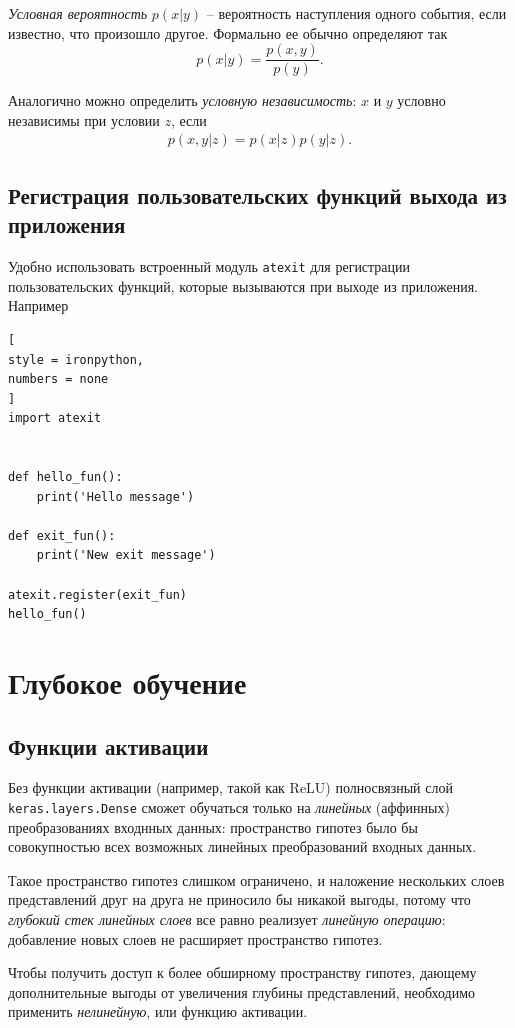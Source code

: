 \documentclass[%
	11pt,
	a4paper,
	utf8,
		]{article}
\begin{document}
\emph{Условная вероятность} $ p(x | y) $ -- вероятность наступления одного события, если известно, что произошло другое. Формально ее обычно определяют так
$$
p(x | y) = \dfrac{ p(x, y) }{p(y)}.
$$

Аналогично можно определить \emph{условную независимость}: $ x $ и $ y $ условно независимы при условии $ z $, если
\begin{align*}
	p(x, y | z) = p(x | z)p(y | z).
\end{align*}

\subsection{Регистрация пользовательских функций выхода из приложения}

Удобно использовать встроенный модуль \texttt{atexit} для регистрации пользовательских функций, которые вызываются при выходе из приложения. Например
\begin{lstlisting}[
style = ironpython,
numbers = none	
]
import atexit


def hello_fun():
    print('Hello message')

def exit_fun():
    print('New exit message')

atexit.register(exit_fun)
hello_fun()
\end{lstlisting}


\section{Глубокое обучение}

\subsection{Функции активации}

Без функции активации (например, такой как ReLU) полносвязный слой \texttt{keras.layers.Dense} сможет обучаться только на \emph{линейных} (аффинных) преобразованиях входнных данных: пространство гипотез было бы совокупностью всех возможных линейных преобразований входных данных.

Такое пространство гипотез слишком ограничено, и наложение нескольких слоев представлений друг на друга не приносило бы никакой выгоды, потому что \emph{глубокий стек линейных слоев} все равно реализует \emph{линейную операцию}: добавление новых слоев не расширяет пространство гипотез.

Чтобы получить доступ к более обширному пространству гипотез, дающему дополнительные выгоды от увеличения глубины представлений, необходимо применить \emph{нелинейную}, или функцию активации.
\end{document}
